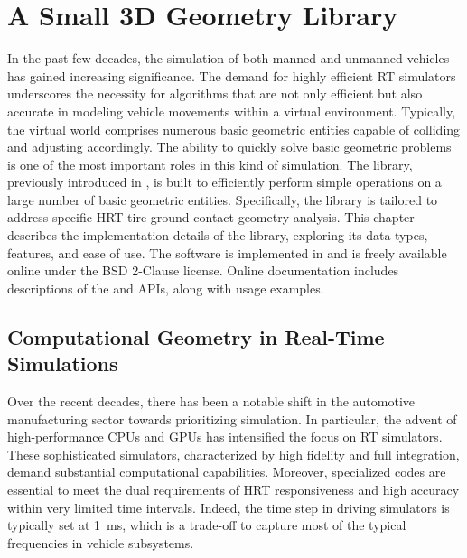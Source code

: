 
\chapter{A Small 3D Geometry Library}
\label{app1:acme}

In the past few decades, the simulation of both manned and unmanned vehicles has gained increasing significance. The demand for highly efficient \ac{RT} simulators underscores the necessity for algorithms that are not only efficient but also accurate in modeling vehicle movements within a virtual environment. Typically, the virtual world comprises numerous basic geometric entities capable of colliding and adjusting accordingly. The ability to quickly solve basic geometric problems is one of the most important roles in this kind of simulation. The \Acme{} library, previously introduced in \citet{stocco2021acme}, is built to efficiently perform simple operations on a large number of basic geometric entities. Specifically, the library is tailored to address specific \ac{HRT} tire-ground contact geometry analysis. This chapter describes the implementation details of the \Acme{} library, exploring its data types, features, and ease of use. The software is implemented in \cpp{} and is freely available online under the \ac{BSD} 2-Clause license. Online documentation includes descriptions of the \cpp{} and \Matlab{} \Mex{} \acp{API}, along with usage examples.


\section{Computational Geometry in Real-Time Simulations}
\label{app1:sec:acme_motivation}

Over the recent decades, there has been a notable shift in the automotive manufacturing sector towards prioritizing simulation. In particular, the advent of high-performance \acp{CPU} and \acp{GPU} has intensified the focus on \ac{RT} simulators. These sophisticated simulators, characterized by high fidelity and full integration, demand substantial computational capabilities. Moreover, specialized codes are essential to meet the dual requirements of \ac{HRT} responsiveness and high accuracy within very limited time intervals. Indeed, the time step in driving simulators is typically set at \SI{1}{\milli\second}, which is a trade-off to capture most of the typical frequencies in vehicle subsystems.

